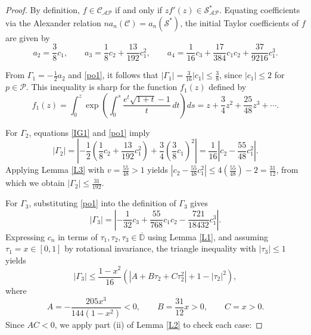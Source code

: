\documentclass[10pt,a4paper]{amsart}
\numberwithin{equation}{section}
\begin{document}
\begin{proof}
By definition, $f \in \mathcal{C}_{\mathcal{AP}}$ if and only if $zf'(z) \in \mathcal{S}_{\mathcal{AP}}^{*}$. Equating coefficients via the Alexander relation $n a_n(\mathcal{C}) = a_n(\mathcal{S}^{*})$, the initial Taylor coefficients of $f$ are given by
\begin{equation}\label{po1}
a_2 = \frac{3}{8}c_1, \qquad a_3 = \frac{1}{8}c_2 + \frac{13}{192}c_1^2, \qquad a_4 = \frac{1}{16}c_3 + \frac{17}{384}c_1c_2 + \frac{37}{9216}c_1^3.
\end{equation}

From $\Gamma_1 = -\frac{1}{2}a_2$ and \eqref{po1}, it follows that $|\Gamma_1| = \frac{3}{16}|c_1| \le \frac{3}{8}$, since $|c_1| \le 2$ for $p \in \mathcal{P}$. This inequality is sharp for the function $f_1(z)$ defined by
\begin{equation}\label{ext1}
f_1(z) = \int_0^z \exp \left( \int_0^s \frac{e^t\sqrt{1+t}-1}{t} \, dt \right) ds = z + \frac{3}{4}z^2 + \frac{25}{48}z^3 + \cdots.
\end{equation}

For $\Gamma_2$, equations \eqref{IG1} and \eqref{po1} imply
\[
|\Gamma_2| = \left| -\frac{1}{2} \left( \frac{1}{8}c_2 + \frac{13}{192}c_1^2 \right) + \frac{3}{4} \left( \frac{3}{8}c_1 \right)^2 \right| = \frac{1}{16}\left| c_2 - \frac{55}{48}c_1^2 \right|.
\]
Applying Lemma \ref{L3} with $v = \frac{55}{48} > 1$ yields $\left| c_2 - \frac{55}{48}c_1^2 \right| \le 4\left(\frac{55}{48}\right)-2 = \frac{31}{12}$, from which we obtain $|\Gamma_2| \le \frac{31}{192}$.

For $\Gamma_3$, substituting \eqref{po1} into the definition of $\Gamma_3$ gives
\begin{equation}\label{po2}
|\Gamma_3| = \left| -\frac{1}{32}c_3 + \frac{55}{768}c_1c_2 - \frac{721}{18432}c_1^3 \right|.
\end{equation}
Expressing $c_n$ in terms of $\tau_1, \tau_2, \tau_3 \in \overline{\mathbb{D}}$ using Lemma \ref{L1}, and assuming $\tau_1 = x \in [0,1]$ by rotational invariance, the triangle inequality with $|\tau_3| \le 1$ yields
\begin{equation}\label{po4}
|\Gamma_3| \le \frac{1 - x^2}{16} \left( \left| A + B \tau_2 + C \tau_2^2 \right| + 1 - |\tau_2|^2 \right),
\end{equation}
where
\begin{equation}\label{po5}
A = -\frac{205x^3}{144(1 - x^2)} < 0, \qquad B = \frac{31}{12}x > 0, \qquad C = x > 0.
\end{equation}
Since $AC < 0$, we apply part (ii) of Lemma \ref{L2} to check each case:


\end{proof}
\end{document}
